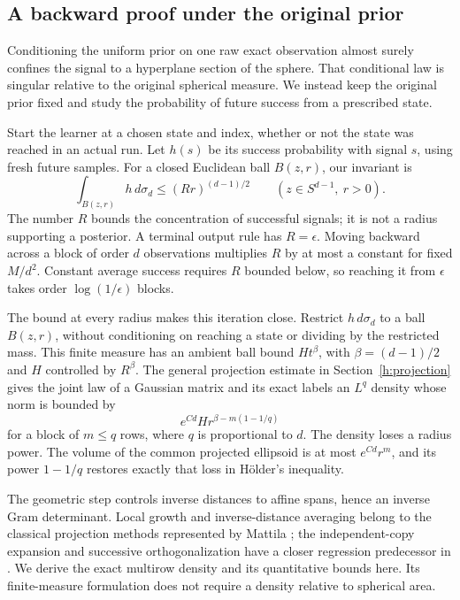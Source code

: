 \subsection{A backward proof under the original prior}

Conditioning the uniform prior on one raw exact observation almost
surely confines the signal to a hyperplane section of the sphere. That
conditional law is singular relative to the original spherical
measure. We instead keep the original prior fixed and study the
probability of future success from a prescribed state.

Start the learner at a chosen state and index, whether or not the state
was reached in an actual run. Let \(h(s)\) be its success probability
with signal \(s\), using fresh future samples. For a closed Euclidean
ball \(B(z,r)\), our invariant is
\begin{equation}\label{h:intro:invariant}
 \int_{B(z,r)}h\,d\sigma_d\le(Rr)^{(d-1)/2}
 \qquad(z\in S^{d-1},\ r>0).
\end{equation}
The number \(R\) bounds the concentration of successful signals; it
is not a radius supporting a posterior. A terminal output rule has
\(R=\epsilon\). Moving backward across a block of order \(d\)
observations multiplies \(R\) by at most a constant for fixed
\(M/d^2\). Constant average success requires \(R\) bounded below, so
reaching it from \(\epsilon\) takes order \(\log(1/\epsilon)\) blocks.

The bound at every radius makes this iteration close. Restrict
\(h\,d\sigma_d\) to a ball \(B(z,r)\), without conditioning on reaching
a state or dividing by the restricted mass. This finite measure has
an ambient ball bound \(H t^\beta\), with \(\beta=(d-1)/2\) and
\(H\) controlled by \(R^\beta\). The general projection estimate in
Section~\ref{h:projection} gives the joint law of a Gaussian matrix
and its exact labels an \(L^q\) density whose norm is bounded by
\[
 e^{Cd}H r^{\beta-m(1-1/q)}
\]
for a block of \(m\le q\) rows, where \(q\) is proportional to \(d\).
The density loses a radius power. The volume of the common projected
ellipsoid is at most \(e^{Cd}r^m\), and its power \(1-1/q\) restores
exactly that loss in H\"older's inequality.

The geometric step controls inverse distances to affine spans, hence
an inverse Gram determinant. Local growth and inverse-distance
averaging belong to the classical projection methods represented by
Mattila \cite[Lemma~5.1 and Theorem~5.4]{Mattila1975}; the
independent-copy expansion and successive orthogonalization have a
closer regression predecessor in
\cite[Section~7, Lemma~12]{SSV2019}. We derive the exact multirow
density and its quantitative bounds here. Its finite-measure
formulation does not require a density relative to spherical area.

